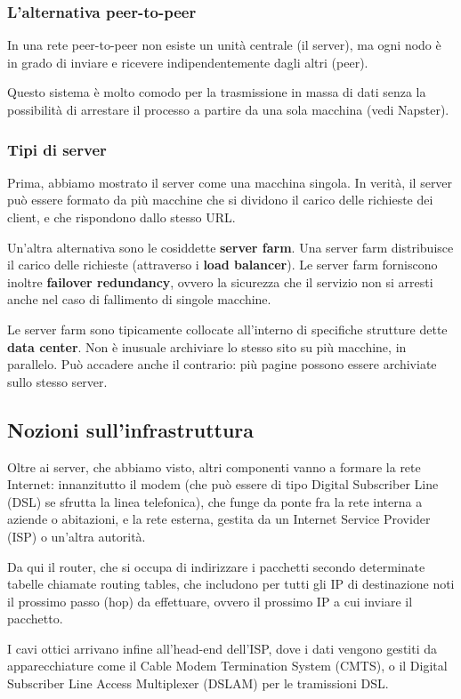 \documentclass[a4paper,11pt]{article}
\begin{document}
\subsubsection{L'alternativa peer-to-peer}
In una rete peer-to-peer non esiste un unità centrale (il server), ma ogni nodo è in grado di inviare e ricevere indipendentemente dagli altri (peer).

Questo sistema è molto comodo per la trasmissione in massa di dati senza la possibilità di arrestare il processo a partire da una sola macchina (vedi Napster).

\subsubsection{Tipi di server}
Prima, abbiamo mostrato il server come una macchina singola.
In verità, il server può essere formato da più macchine che si dividono il carico delle richieste dei client, e che rispondono dallo stesso URL.

Un'altra alternativa sono le cosiddette \textbf{server farm}.
Una server farm distribuisce il carico delle richieste (attraverso i \textbf{load balancer}).
Le server farm forniscono inoltre \textbf{failover redundancy}, ovvero la sicurezza che il servizio non si arresti anche nel caso di fallimento di singole macchine.

Le server farm sono tipicamente collocate all'interno di specifiche strutture dette \textbf{data center}.
Non è inusuale archiviare lo stesso sito su più macchine, in parallelo.
Può accadere anche il contrario: più pagine possono essere archiviate sullo stesso server.

\subsection{Nozioni sull'infrastruttura}
Oltre ai server, che abbiamo visto, altri componenti vanno a formare la rete Internet: innanzitutto il modem (che può essere di tipo Digital Subscriber Line (DSL) se sfrutta la linea telefonica), che funge da ponte fra la rete interna a aziende o abitazioni, e la rete esterna, gestita da un Internet Service Provider (ISP) o un'altra autorità.

Da qui il router, che si occupa di indirizzare i pacchetti secondo determinate tabelle chiamate routing tables, che includono per tutti gli IP di destinazione noti il prossimo passo (hop) da effettuare, ovvero il prossimo IP a cui inviare il pacchetto.

I cavi ottici arrivano infine all'head-end dell'ISP, dove i dati vengono gestiti da apparecchiature come il Cable Modem Termination System (CMTS), o il Digital Subscriber Line Access Multiplexer (DSLAM) per le tramissioni DSL.
\end{document}
